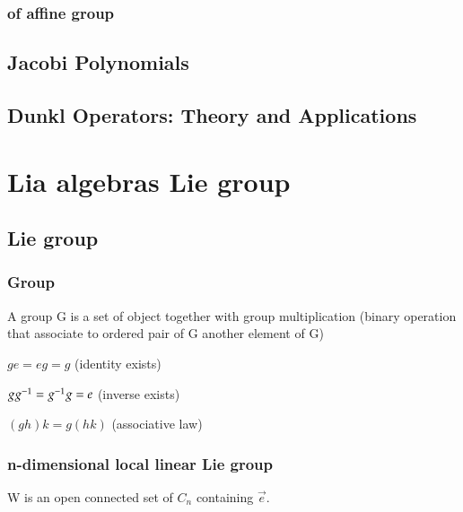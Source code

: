 \documentclass[oneside,12pt]{memoir}
\begin{document}
\subsection{\IR{} of affine group}

\section{Jacobi Polynomials}


\section{Dunkl Operators: Theory and Applications}

\chapter{Lia algebras Lie group}
\PartialToc

\section{Lie group}

\subsection{Group}
A group G is a set of object together with group multiplication (binary operation that associate to ordered pair of G another element of G)
\begin{itemize*}
\item $ge=eg=g$ (identity exists)
\item $gg^{-1}=g^{-1}g=e$ (inverse exists)
\item $(gh)k=g(hk)$ (associative law)
\end{itemize*}


\subsection{n-dimensional local linear Lie group}

W is an open connected set of $C_n$ containing $\vec{e}$.
\end{document}
